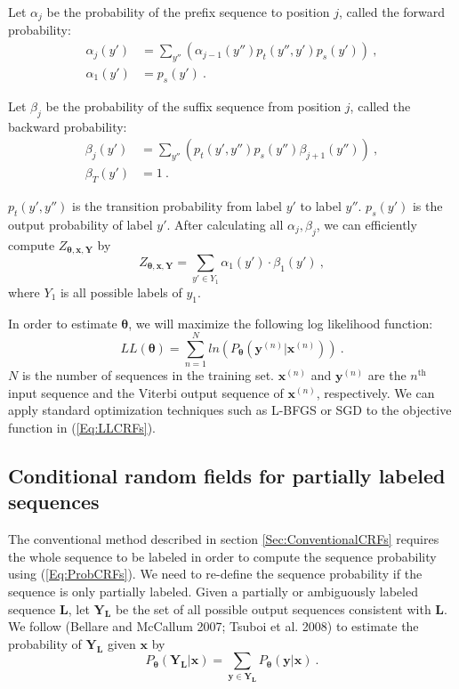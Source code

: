 \documentclass[english]{jnlp_JS2.0}
\begin{document}
Let $\alpha_j$ be the probability of the prefix sequence to position $j$, called the forward probability:
\begin{align*}
	\alpha_j(y') & = \sum_{y''} \left( \alpha_{j-1}(y'') p_t(y'',y') p_s(y') \right)\ , \\
	\alpha_1(y') & = p_s(y')\ .
\end{align*}

Let $\beta_j$ be the probability of the suffix sequence from position $j$, called the backward probability:
\begin{align*}
	\beta_j(y') & = \sum_{y''} \left( p_t(y',y'') p_s(y'') \beta_{j+1}(y'') \right)\ , \\
	\beta_T(y') & = 1\ .
\end{align*}

$p_t(y',y'')$ is the transition probability from label $y'$ to label $y''$. $p_s(y')$ is the output probability of label $y'$. After calculating all $\alpha_j, \beta_j$, we can efficiently compute $Z_{\mathbf{\theta,x,Y}}$ by
\[
	Z_\mathbf{\theta,x,Y} = \sum_{y'\in Y_1} {\alpha_1(y') \cdot \beta_1(y')}\ ,
\]
where $Y_1$ is all possible labels of $y_1$.

In order to estimate $\mathbf{\theta}$, we will maximize the following log likelihood function:
\begin{equation}
	LL(\mathbf{\theta}) = \sum_{n=1}^N ln(P_{\mathbf{\theta}}(\mathbf{y}^{(n)}|\mathbf{x}^{(n)}))\ . \label{Eq:LLCRFs}
\end{equation}
$N$ is the number of sequences in the training set. $\mathbf{x}^{(n)}$ and $\mathbf{y}^{(n)}$ are the $n^{\text{th}}$ input sequence and the Viterbi output sequence of $\mathbf{x}^{(n)}$, respectively. We can apply standard optimization techniques such as L-BFGS \cite{L-BFGS} or SGD \cite{Vishwanathan2006} to the objective function in (\ref{Eq:LLCRFs}).


\subsection{Conditional random fields for partially labeled sequences}

The conventional method described in section \ref{Sec:ConventionalCRFs} requires the whole sequence to be labeled in order to compute the sequence probability using (\ref{Eq:ProbCRFs}). We need to re-define the sequence probability if the sequence is only partially labeled. Given a partially or ambiguously labeled sequence $\mathbf{L}$, let $\mathbf{Y_L}$ be the set of all possible output sequences consistent with $\mathbf{L}$. 
\pagebreak
We follow (Bellare and McCallum 2007; Tsuboi et al. 2008)
to estimate the probability of $\mathbf{Y_L}$ given $\mathbf{x}$ by
\begin{equation}
	P_{\mathbf{\theta}}(\mathbf{Y_L|x}) = \sum_{\mathbf{y \in Y_L}} P_{\mathbf{\theta}} (\mathbf{y|x})\ . \label{Eq:ProbPartialCRFs}
\end{equation}
\end{document}
